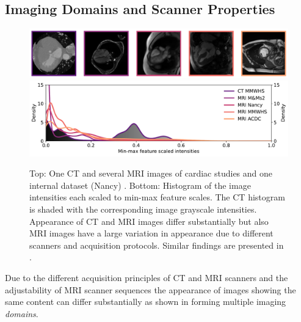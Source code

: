     \subsection{Imaging Domains and Scanner Properties} %

        \begin{figure}
            \begin{minipage}{\textwidth}
                \centering
                \includegraphics[width=.89\textwidth]{sections/02_background/figures/contrast_imgs.pdf}
                \includegraphics[width=\textwidth]{sections/02_background/figures/contrast_histograms.pdf}
                \caption{Top: One \ac{CT} and several \ac{MRI} images of cardiac studies and one internal dataset (Nancy) \citep{zhuang2019evaluation,martin2023deep,
                campello2021multi,bernard2018deep}. Bottom: Histogram of the image intensities each scaled to min-max feature scales. The \ac{CT} histogram is shaded with the corresponding image grayscale intensities. Appearance of \ac{CT} and \ac{MRI} images differ substantially but also \ac{MRI} images have a large variation in appearance due to different scanners and acquisition protocols. Similar findings are presented in \citep{guan2021domain}.}
                \label{fig:domain_contrast}
            \end{minipage}
        \end{figure}

        Due to the different acquisition principles of \ac{CT} and \ac{MRI} scanners and the adjustability of \ac{MRI} scanner sequences the appearance of images showing the same content can differ substantially as shown in  forming multiple imaging \emph{domains}.

